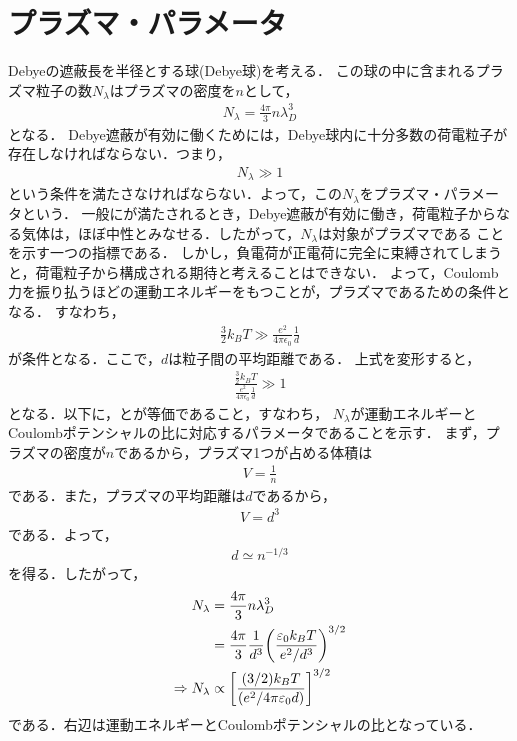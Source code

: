 \documentclass{report}
\begin{document}
    \section{プラズマ・パラメータ}
      Debyeの遮蔽長を半径とする球(Debye球)を考える．
      この球の中に含まれるプラズマ粒子の数$N_\lambda$はプラズマの密度を$n$として，
      \begin{align}
        N_\lambda = \frac{4\pi}{3}n \lambda_D^3
      \end{align}
      となる．
      Debye遮蔽が有効に働くためには，Debye球内に十分多数の荷電粒子が存在しなければならない．つまり，
      \begin{align}
        N_\lambda \gg 1 \label{plasma-parameter}
      \end{align}
      という条件を満たさなければならない．よって，この$N_\lambda$をプラズマ・パラメータという．
      一般にが満たされるとき，Debye遮蔽が有効に働き，荷電粒子からなる気体は，ほぼ中性とみなせる．したがって，$N_\lambda$は対象がプラズマである
      ことを示す一つの指標である．
      しかし，負電荷が正電荷に完全に束縛されてしまうと，荷電粒子から構成される期待と考えることはできない．
      よって，Coulomb力を振り払うほどの運動エネルギーをもつことが，プラズマであるための条件となる．
      すなわち，
      \begin{align}
        \frac{3}{2}k_B T \gg \frac{e^2}{4\pi\epsilon_0}\frac{1}{d}
      \end{align}
      が条件となる．ここで，$d$は粒子間の平均距離である．
      上式を変形すると，
      \begin{align}
        \frac{\frac{3}{2}k_B T}{\frac{e^2}{4\pi\epsilon_0}\frac{1}{d}} \gg 1 \label{plasma-parameter2}
      \end{align}
      となる．以下に，とが等価であること，すなわち，
      $N_\lambda$が運動エネルギーとCoulombポテンシャルの比に対応するパラメータであることを示す．
      まず，プラズマの密度が$n$であるから，プラズマ1つが占める体積は
      \begin{align}
        V = \frac{1}{n}
      \end{align}
      である．また，プラズマの平均距離は$d$であるから，
      \begin{align}
        V = d^3
      \end{align}
      である．よって，
      \begin{align}
        d \simeq n^{-1/3}
      \end{align}
      を得る．したがって，
      \begin{align}
        N_\lambda &= \frac{4\pi}{3}n \lambda_D^3\\
        &= \frac{4\pi}{3}\frac{1}{d^3}\qty(\frac{\varepsilon_0 k_B T}{e^2/d^3})^{3/2}\\
        \Rightarrow N_\lambda &\propto \qty[\frac{(3/2)k_B T}{(e^2/4\pi\varepsilon_0 d)}]^{3/2}
      \end{align}
      である．右辺は運動エネルギーとCoulombポテンシャルの比となっている．
\end{document}
